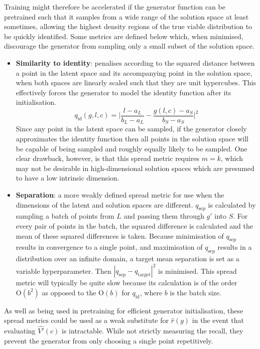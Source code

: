 \documentclass[../../main.tex]{subfiles}
\begin{document}
Training might therefore be accelerated if the generator function can be pretrained such that it samples from a wide range of the solution space at least sometimes, allowing the highest density regions of the true viable distribution to be quickly identified.
Some metrics are defined below which, when minimised, discourage the generator from sampling only a small subset of the solution space.
\begin{itemize}
    \item[] \textbf{Similarity to identity}: penalises according to the squared distance between a point in the latent space and its accompanying point in the solution space, when both spaces are linearly scaled such that they are unit hypercubes.
    This effectively forces the generator to model the identity function after its initialisation.
    $$q_\text{id}(g, l, c) = \bigg|\frac{l - a_L}{b_L - a_L} -
    \frac{g(l, c) - a_S}{b_S - a_S}\bigg|^2$$
    Since any point in the latent space can be sampled, if the generator closely approximates the identity function then all points in the solution space will be capable of being sampled and roughly equally likely to be sampled.
    One clear drawback, however, is that this spread metric requires $m = k$, which may not be desirable in high-dimensional solution spaces which are presumed to have a low intrinsic dimension.
    \item[] \textbf{Separation}: a more weakly defined spread metric for use when the dimensions of the latent and solution spaces are different.
    $q_\text{sep}$ is calculated by sampling a batch of points from $L$ and passing them through $g'$ into $S$.
    For every pair of points in the batch, the squared difference is calculated and the mean of these squared differences is taken.
    Because minimisation of $q_\text{sep}$ results in convergence to a single point, and maximisation of $q_\text{sep}$ results in a distribution over an infinite domain, a target mean separation is set as a variable hyperparameter.
    Then $|q_\text{sep} - q_\text{target}|^2$ is minimised.
    This spread metric will typically be quite slow because its calculation is of the order $\text{O}(b^2)$ as opposed to the $\text{O}(b)$ for $q_\text{id}$, where $b$ is the batch size.
  \end{itemize}
As well as being used in pretraining for efficient generator initialisation, these spread metrics could be used as a weak substitute for $\hat{r}(g)$ in the event that evaluating $\hat{V'}(c)$ is intractable.
While not strictly measuring the recall, they prevent the generator from only choosing a single point repetitively.
\end{document}
